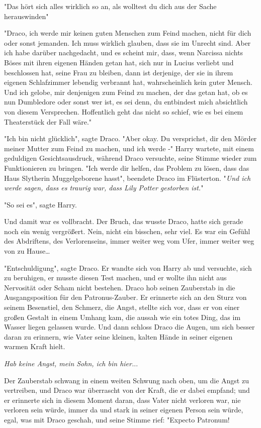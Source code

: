 {"Das hört sich alles wirklich so an, als wolltest du dich aus der Sache herauswinden"

"Draco, ich werde mir keinen guten Menschen zum Feind machen, nicht für dich oder sonst jemanden. Ich muss wirklich glauben, dass sie im Unrecht sind. Aber ich habe darüber nachgedacht, und es scheint mir, dass, wenn Narcissa nichts Böses mit ihren eigenen Händen getan hat, sich nur in Lucius verliebt und beschlossen hat, seine Frau zu bleiben, dann ist derjenige, der sie in ihrem eigenen Schlafzimmer lebendig verbrannt hat, wahrscheinlich kein guter Mensch. Und ich gelobe, mir denjenigen zum Feind zu machen, der das getan hat, ob es nun Dumbledore oder sonst wer ist, es sei denn, du entbindest mich absichtlich von diesem Versprechen. Hoffentlich geht das nicht so schief, wie es bei einem Theaterstück der Fall wäre."

"Ich bin nicht glücklich", sagte Draco. "Aber okay. Du versprichst, dir den Mörder meiner Mutter zum Feind zu machen, und ich werde -" Harry wartete, mit einem geduldigen Gesichtsausdruck, während Draco versuchte, seine Stimme wieder zum Funktionieren zu bringen. "Ich werde dir helfen, das Problem zu lösen, dass das Haus Slytherin Muggelgeborene hasst", beendete Draco im Flüsterton. "\emph{Und ich werde sagen, dass es traurig war, dass Lily Potter gestorben ist.}"

"So sei es", sagte Harry.

Und damit war es vollbracht. Der Bruch, das wusste Draco, hatte sich gerade noch ein wenig vergrößert. Nein, nicht ein bisschen, sehr viel. Es war ein Gefühl des Abdriftens, des Verlorenseins, immer weiter weg vom Ufer, immer weiter weg von zu Hause…

"Entschuldigung", sagte Draco. Er wandte sich von Harry ab und versuchte, sich zu beruhigen, er musste diesen Test machen, und er wollte ihn nicht aus Nervosität oder Scham nicht bestehen. Draco hob seinen Zauberstab in die Ausgangsposition für den Patronus-Zauber. Er erinnerte sich an den Sturz von seinem Besenstiel, den Schmerz, die Angst, stellte sich vor, dass er von einer großen Gestalt in einem Umhang kam, die aussah wie ein totes Ding, das im Wasser liegen gelassen wurde. Und dann schloss Draco die Augen, um sich besser daran zu erinnern, wie Vater seine kleinen, kalten Hände in seiner eigenen warmen Kraft hielt.

\emph{Hab keine Angst, mein Sohn, ich bin hier.}..

Der Zauberstab schwang in einem weiten Schwung nach oben, um die Angst zu vertreiben, und Draco war überrascht von der Kraft, die er dabei empfand; und er erinnerte sich in diesem Moment daran, dass Vater nicht verloren war, nie verloren sein würde, immer da und stark in seiner eigenen Person sein würde, egal, was mit Draco geschah, und seine Stimme rief: "Expecto Patronum!

}
